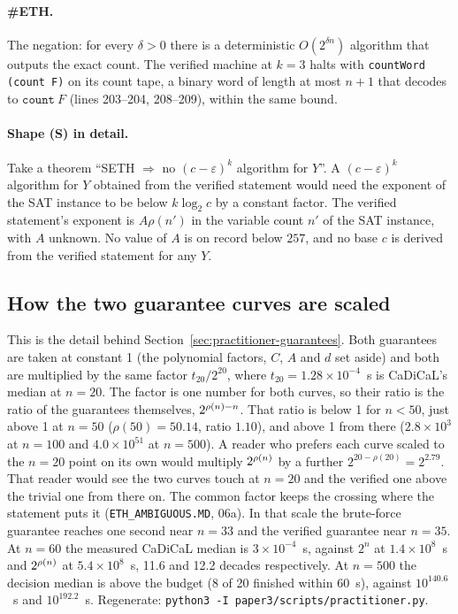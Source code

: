 \paragraph{\#ETH.} The negation: for every $\delta > 0$ there is a
deterministic $O(2^{\delta n})$ algorithm that outputs the exact count.
The verified machine at $k = 3$ halts with \texttt{countWord (count F)}
on its count tape, a binary word of length at most $n + 1$ that decodes
to $\mathtt{count}\ F$ (lines 203--204, 208--209), within the same bound.

\paragraph{Shape (S) in detail.} Take a theorem ``SETH $\Rightarrow$ no
$(c-\varepsilon)^k$ algorithm for $Y$''. A $(c-\varepsilon)^k$ algorithm
for $Y$ obtained from the verified statement would need the exponent of
the SAT instance to be below $k \log_2 c$ by a constant factor. The
verified statement's exponent is $A\rho(n')$ in the variable count $n'$
of the SAT instance, with $A$ unknown. No value of $A$ is on record below
$257$, and no base $c$ is derived from the verified statement for any
$Y$.

\subsection{How the two guarantee curves are scaled}
\label{app:tech-scaling}

This is the detail behind Section~\ref{sec:practitioner-guarantees}.
Both guarantees are taken at constant 1 (the polynomial factors, $C$,
$A$ and $d$ set aside) and both are multiplied by the same factor
$t_{20}/2^{20}$, where $t_{20} = 1.28 \times 10^{-4}$~s is CaDiCaL's
median at $n = 20$. The factor is one number for both curves, so their
ratio is the ratio of the guarantees themselves, $2^{\rho(n) - n}$. That ratio is below
1 for $n < 50$, just above 1 at $n = 50$ ($\rho(50) = 50.14$, ratio
$1.10$), and above 1 from there ($2.8 \times 10^{3}$ at
$n = 100$ and $4.0 \times 10^{51}$ at $n = 500$). A reader who prefers
each curve scaled to the $n = 20$ point on its own would multiply
$2^{\rho(n)}$ by a further $2^{20 - \rho(20)} = 2^{2.79}$. That reader would see the two
curves touch at $n = 20$ and the verified one above the trivial one
from there on. The common factor keeps the crossing where the statement
puts it (\texttt{ETH\_AMBIGUOUS.MD}, 06a). In that scale the
brute-force guarantee reaches one second near $n = 33$ and the verified
guarantee near $n = 35$. At $n = 60$ the measured CaDiCaL median is
$3 \times 10^{-4}$~s, against $2^n$ at $1.4 \times 10^{8}$~s and
$2^{\rho(n)}$ at $5.4 \times 10^{8}$~s, 11.6 and 12.2 decades
respectively. At $n = 500$ the decision median is above the budget
(8 of 20 finished within 60~s), against $10^{140.6}$~s and
$10^{192.2}$~s. Regenerate: \texttt{python3 -I paper3/scripts/practitioner.py}.

\par\endgroup
